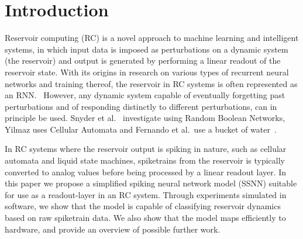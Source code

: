 \section{Introduction}
\label{sec:introduction}

Reservoir computing (RC) is a novel approach to machine learning and intelligent systems, in which input data is imposed as perturbations on a dynamic system (the reservoir) and output is generated by performing a linear readout of the reservoir state.
With its origins in research on various types of recurrent neural networks and training thereof, the reservoir in RC systems is often represented as an RNN.~\cite{Verstraeten2007}
However, any dynamic system capable of eventually forgetting past perturbations and of responding distinctly to different perturbations, can in principle be used.
Snyder et al.~\cite{Snyder2013} investigate using Random Boolean Networks, Yilmaz uses Cellular Automata and Fernando et al.\ use a bucket of water~\cite{Fernando2003}.

In RC systems where the reservoir output is spiking in nature, such as cellular automata and liquid state machines, spiketrains from the reservoir is typically converted to analog values before being processed by a linear readout layer.
In this paper we propose a simplified spiking neural network model (SSNN) suitable for use as a readout-layer in an RC system.
Through experiments simulated in software, we show that the model is capable of classifying reservoir dynamics based on raw spiketrain data.
We also show that the model maps efficiently to hardware, and provide an overview of possible further work.
